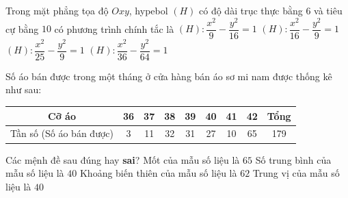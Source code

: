 \begin{ex}%
Trong mặt phẳng tọa độ $Oxy$, hypebol $(H)$ có độ dài trục thực bằng $ 6$ và tiêu cự bằng $ 10$ có phương trình chính tắc là
\choice
{\True $(H)\colon\dfrac{x^2}{9}-\dfrac{y^2}{16}=1$}
{$(H)\colon\dfrac{x^2}{16}-\dfrac{y^2}{9}=1$}
{$(H)\colon\dfrac{x^2}{25}-\dfrac{y^2}{9}=1$}
{$(H)\colon\dfrac{x^2}{36}-\dfrac{y^2}{64}=1$}
\end{ex}
\TNTF
\begin{ex}%
Số áo bán được trong một tháng ở cửa hàng bán áo sơ mi nam được thống kê như sau:
\begin{center}
\begin{tabular}{|c|c|c|c|c|c|c|c|c|}
\hline
Cỡ áo&36&37&38&39&40&41&42&Tổng\\
\hline
Tần số (Số áo bán được) &3&11&32&31&27&10&65&179\\
\hline
\end{tabular}
\end{center}
Các mệnh đề sau đúng hay \textbf{sai}?
\choiceTF
{Mốt của mẫu số liệu là $65$}
{\True Số trung bình của mẫu số liệu là $40$}
{Khoảng biến thiên của mẫu số liệu là $62$}
{\True Trung vị của mẫu số liệu là $40$}
\end{ex}

